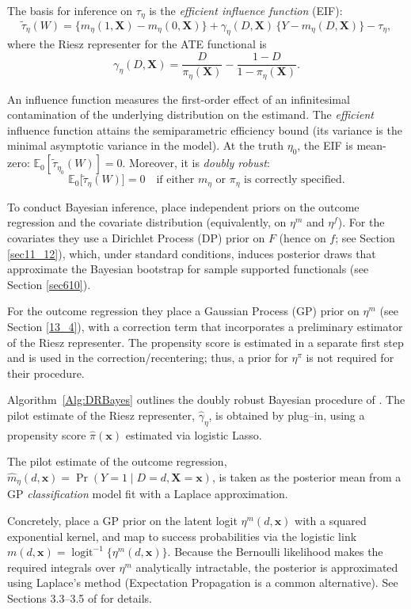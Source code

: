 The basis for inference on $\tau_\eta$ is the \textit{efficient influence function} (EIF):
\[
\tilde{\tau}_\eta(W)
= \big\{m_\eta(1,\mathbf{X})-m_\eta(0,\mathbf{X})\big\}
+ \gamma_\eta(D,\mathbf{X})\,\big\{Y-m_\eta(D,\mathbf{X})\big\}
- \tau_\eta,
\]
where the Riesz representer for the ATE functional is
\[
\gamma_\eta(D,\mathbf{X})
= \frac{D}{\pi_\eta(\mathbf{X})}
- \frac{1-D}{1-\pi_\eta(\mathbf{X})}.
\]

An influence function measures the first-order effect of an infinitesimal contamination of the underlying distribution on the estimand. The \emph{efficient} influence function attains the semiparametric efficiency bound (its variance is the minimal asymptotic variance in the model). At the truth $\eta_0$, the EIF is mean-zero: $\mathbb{E}_0[\tilde{\tau}_{\eta_0}(W)]=0$. Moreover, it is \emph{doubly robust}:
\[
\mathbb{E}_0\!\big[\tilde{\tau}_\eta(W)\big]=0
\quad\text{if either } m_\eta \text{ or } \pi_\eta \text{ is correctly specified.}
\]

To conduct Bayesian inference, \cite{breunig2025double} place independent priors on the outcome regression and the covariate distribution (equivalently, on $\eta^m$ and $\eta^f$). For the covariates they use a Dirichlet Process (DP) prior on $F$ (hence on $f$; see Section \ref{sec11_12}), which, under standard conditions, induces posterior draws that approximate the Bayesian bootstrap for sample supported functionals \cite{Lo1987BayesianBootstrap} (see Section \ref{sec610}). 

For the outcome regression they place a Gaussian Process (GP) prior on $\eta^m$ (see Section \ref{13_4}), with a correction term that incorporates a preliminary estimator of the Riesz representer. The propensity score is estimated in a separate first step and is used in the correction/recentering; thus, a prior for $\eta^\pi$ is not required for their procedure.

Algorithm~\ref{Alg:DRBayes} outlines the doubly robust Bayesian procedure of \cite{breunig2025double}. 
The pilot estimate of the Riesz representer, $\hat\gamma_\eta$, is obtained by plug–in, using a propensity score $\hat\pi(\mathbf{x})$ estimated via logistic Lasso.
 
The pilot estimate of the outcome regression, $\hat m_\eta(d,\mathbf{x})=\Pr(Y=1\mid D=d,\mathbf{X}=\mathbf{x})$, is taken as the posterior mean from a GP \emph{classification} model fit with a Laplace approximation.

Concretely, place a GP prior on the latent logit
$\eta^m(d,\mathbf{x})$ with a squared exponential kernel, and map to
success probabilities via the logistic link
$m(d,\mathbf{x})=\operatorname{logit}^{-1}\{\eta^m(d,\mathbf{x})\}$.
Because the Bernoulli likelihood makes the required integrals over
$\eta^m$ analytically intractable, the posterior is approximated using
Laplace’s method (Expectation Propagation is a common alternative).
See Sections 3.3–3.5 of \cite{rasmussen2006gaussian} for details.

